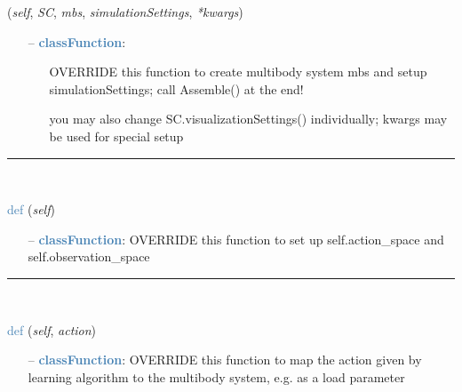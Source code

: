 \begin{itemize}[leftmargin=1.4cm]
\begin{flushleft}
({\it self}, {\it SC}, {\it mbs}, {\it simulationSettings}, {\it **kwargs})
\end{flushleft}
\setlength{\itemindent}{0.7cm}
\begin{itemize}[leftmargin=0.7cm]
\item[--]\textcolor{steelblue}{\bf classFunction}: \vspace{-6pt}
\begin{itemize}[leftmargin=1.2cm]
\setlength{\itemindent}{-0.7cm}
\item[]OVERRIDE this function to create multibody system mbs and setup simulationSettings; call Assemble() at the end!
\item[]you may also change SC.visualizationSettings() individually; kwargs may be used for special setup
\end{itemize}
\vspace{12pt}\end{itemize}
%
\noindent\rule{8cm}{0.75pt}\vspace{1pt} \\ 
\begin{flushleft}
\noindent \textcolor{steelblue}{def {\bf {}}}\label{sec:artificialIntelligence:OpenAIGymInterfaceEnv:SetupSpaces}
({\it self})
\end{flushleft}
\setlength{\itemindent}{0.7cm}
\begin{itemize}[leftmargin=0.7cm]
\item[--]\textcolor{steelblue}{\bf classFunction}: OVERRIDE this function to set up self.action\_space and self.observation\_space
\vspace{12pt}\end{itemize}
%
\noindent\rule{8cm}{0.75pt}\vspace{1pt} \\ 
\begin{flushleft}
\noindent \textcolor{steelblue}{def {\bf {}}}\label{sec:artificialIntelligence:OpenAIGymInterfaceEnv:MapAction2MBS}
({\it self}, {\it action})
\end{flushleft}
\setlength{\itemindent}{0.7cm}
\begin{itemize}[leftmargin=0.7cm]
\item[--]\textcolor{steelblue}{\bf classFunction}: OVERRIDE this function to map the action given by learning algorithm to the multibody system, e.g. as a load parameter

\end{itemize}
\end{itemize}
